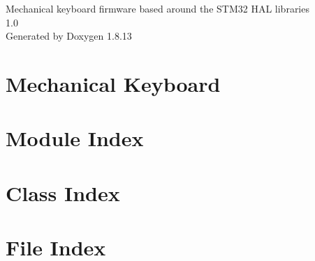 \documentclass[twoside]{book}
\newcommand{\+}{\discretionary{\mbox{\scriptsize$\hookleftarrow$}}{}{}}
\newcommand{\clearemptydoublepage}{%
  \newpage{\pagestyle{empty}\cleardoublepage}%
}
\begin{document}
\hypersetup{pageanchor=false,
             bookmarksnumbered=true,
             pdfencoding=unicode
            }
\begin{titlepage}
\vspace*{7cm}
\begin{center}%
{\Large Mechanical keyboard firmware based around the S\+T\+M32 H\+AL libraries \\[1ex]\large 1.\+0 }\\
\vspace*{1cm}
{\large Generated by Doxygen 1.8.13}\\
\end{center}
\end{titlepage}
\clearemptydoublepage
{}
\tableofcontents
\clearemptydoublepage
{}
\hypersetup{pageanchor=true}

\chapter{Mechanical Keyboard}
\label{index}\hypertarget{index}{}
\chapter{Module Index}

\chapter{Class Index}

\chapter{File Index}

\end{document}
